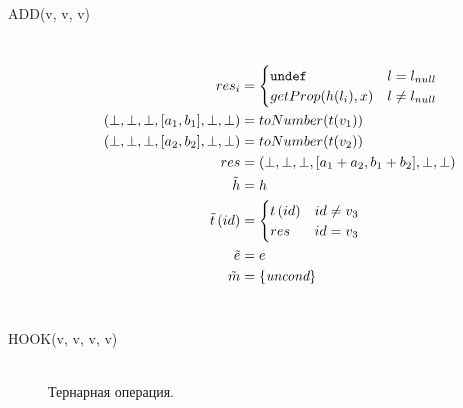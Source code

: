 \begin{description}
  \item[{\small\ttfamily ADD(v, v, v)}] ~\\%
  \[
  \begin{aligned}
    res_i &= \begin{cases}
      \texttt{undef} & l = l_{null} \\
      getProp(h(l_i), x) & l \neq l_{null} \\
    \end{cases} \\
    (\bot, \bot, \bot, [a_1, b_1], \bot, \bot) &= toNumber(t(v_1)) \\
    (\bot, \bot, \bot, [a_2, b_2], \bot, \bot) &= toNumber(t(v_2)) \\
    res &= (\bot, \bot, \bot, [a_1 + a_2, b_1 + b_2], \bot, \bot) \\
    \tilde{h} &= h \\ 
    \tilde{t}\left( id \right) &= 
      \begin{cases}
	 t\left( id \right) & id \neq v_3 \\
	 res & id = v_3 \\
      \end{cases} \\ 
    \tilde{e} &= e \\
  \tilde{m} &= \{\emph{uncond}\} \\
  \end{aligned}
  \]
  \\
  \item[{\small\ttfamily HOOK(v, v, v, v)}] ~\\%
  Тернарная операция.
\end{description}

